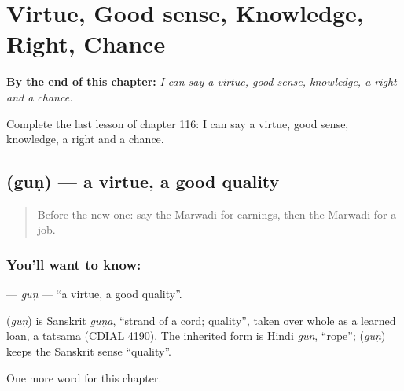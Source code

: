 
\chapter{Virtue, Good sense, Knowledge, Right, Chance}
\label{ch:mw-virtue-good-sense-knowledge-right-chance}

\begin{chapteropening}
\textbf{By the end of this chapter:} \emph{I can say a virtue, good sense, knowledge, a right and a chance.}

Complete the last lesson of chapter 116: I can say a virtue, good sense, knowledge, a right and a chance.
\end{chapteropening}

\section[\texorpdfstring{\mw{गुण} (guṇ)}{गुण (guṇ)}]{ (guṇ) — a virtue, a good quality}

\label{lesson:MW-C116-gun}



\begin{quote}
Before the new one: say the Marwadi for earnings, then the Marwadi for a job.
\end{quote}

\subsection*{You'll want to know: }
\textbf{} — \emph{guṇ} — \textquotedblleft{}a virtue, a good quality\textquotedblright{}.

\begin{cousinweb}
\textbf{} (\emph{guṇ}) is Sanskrit \emph{guṇa}, \textquotedblleft{}strand of a cord; quality\textquotedblright{}, taken over whole as a learned loan, a tatsama (CDIAL 4190). The inherited form is Hindi \emph{gun}, \textquotedblleft{}rope\textquotedblright{}; \textbf{} (\emph{guṇ}) keeps the Sanskrit sense \textquotedblleft{}quality\textquotedblright{}.
\end{cousinweb}

\begin{grammarlens}[title={What you've built}]
One more word for this chapter.
\end{grammarlens}

